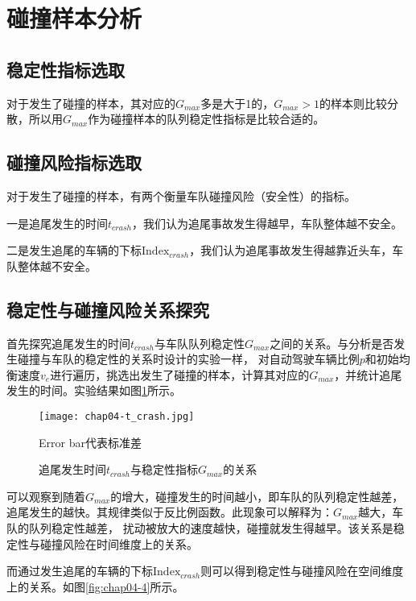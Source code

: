 \section{碰撞样本分析}

\subsection{稳定性指标选取}

对于发生了碰撞的样本，其对应的$G_{max}$多是大于1的，$G_{max} > 1$的样本则比较分散，所以用$G_{max}$作为碰撞样本的队列稳定性指标是比较合适的。

\subsection{碰撞风险指标选取}

对于发生了碰撞的样本，有两个衡量车队碰撞风险（安全性）的指标。

一是追尾发生的时间$t_{crash}$，我们认为追尾事故发生得越早，车队整体越不安全。

二是发生追尾的车辆的下标$\mathrm{Index}_{crash}$，我们认为追尾事故发生得越靠近头车，车队整体越不安全。

\subsection{稳定性与碰撞风险关系探究}

首先探究追尾发生的时间$t_{crash}$与车队队列稳定性$G_{max}$之间的关系。与分析是否发生碰撞与车队的稳定性的关系时设计的实验一样，
对自动驾驶车辆比例$p$和初始均衡速度$v_e$进行遍历，挑选出发生了碰撞的样本，计算其对应的$G_{max}$，并统计追尾发生的时间。实验结果如图\ref{fig:chap04-3}所示。

\begin{figure}
    \centering
    \texttt{[image: chap04-t\_crash.jpg]}
    \caption*{Error bar代表标准差}
    \caption{追尾发生时间$t_{crash}$与稳定性指标$G_{max}$的关系}
    \label{fig:chap04-3}
\end{figure} 

可以观察到随着$G_{max}$的增大，碰撞发生的时间越小，即车队的队列稳定性越差，追尾发生的越快。其规律类似于反比例函数。此现象可以解释为：$G_{max}$越大，车队的队列稳定性越差，
扰动被放大的速度越快，碰撞就发生得越早。该关系是稳定性与碰撞风险在时间维度上的关系。

而通过发生追尾的车辆的下标$\mathrm{Index}_{crash}$则可以得到稳定性与碰撞风险在空间维度上的关系。如图\ref{fig:chap04-4}所示。

